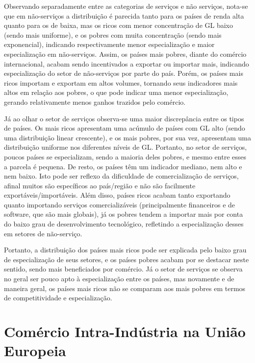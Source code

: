 Observando separadamente entre as categorias de serviços e não serviços, nota-se que em não-serviços a distribuição é parecida tanto para os países de renda alta quanto para os de baixa, mas os ricos com menor concentração de GL baixo (sendo mais uniforme), e os pobres com muita concentração (sendo mais exponencial), indicando respectivamente menor especialização e maior especialização em não-serviços. Assim, os países mais pobres, diante do comércio internacional, acabam sendo incentivados a exportar ou importar mais, indicando especialização do setor de não-serviços por parte do país. Porém, os países mais ricos importam e exportam em altos volumes, tornando seus indicadores mais altos em relação aos pobres, o que pode indicar uma menor especialização, gerando relativamente menos ganhos trazidos pelo comércio.

Já ao olhar o setor de serviços observa-se uma maior discrepância entre os tipos de países. Os mais ricos apresentam uma acúmulo de países com GL alto (sendo uma distribuição linear crescente), e os mais pobres, por sua vez, apresentam uma distribuição uniforme nos diferentes níveis de GL. Portanto, no setor de serviços, poucos países se especializam, sendo a maioria deles pobres, e mesmo entre esses a parcela é pequena. De resto, os países têm um indicador mediano, nem alto e nem baixo. Isto pode ser reflexo da dificuldade de comercialização de serviços, afinal muitos são específicos ao país/região e não são facilmente exportáveis/importáveis. Além disso, países ricos acabam tanto exportando quanto importando serviços comercializáveis (principalmente financeiros e de software, que são mais globais), já os pobres tendem a importar mais por conta do baixo grau de desenvolvimento tecnológico, refletindo a especialização desses em setores de não-serviço.

Portanto, a distribuição dos países mais ricos pode ser explicada pelo baixo grau de especialização de seus setores, e os países pobres acabam por se destacar neste sentido, sendo mais beneficiados por comércio. Já o setor de serviços se observa no geral ser pouco apto à especialização entre os países, mas novamente e de maneira geral, os países mais ricos não se comparam aos mais pobres em termos de competitividade e especialização.

\clearpage
\section{Comércio Intra-Indústria na União Europeia}
\setcounter{subsection}{1}

